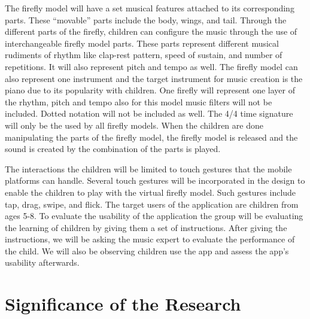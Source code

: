     The firefly model will have a set musical features attached to its corresponding parts. These “movable” parts include the body, wings, and tail. Through the different parts of the firefly, children can configure the music through the use of interchangeable firefly model parts. These parts represent different musical rudiments of rhythm like clap-rest pattern, speed of sustain, and number of repetitions. It will also represent pitch and tempo as well. The firefly model can also represent one instrument and the target instrument for music creation is the piano due to its popularity with children. One firefly will represent one layer of the rhythm, pitch and tempo also for this model music filters will not be included. Dotted notation will not be included as well. The 4/4 time signature will only be the used by all firefly models. When the children are done manipulating the parts of the firefly model, the firefly model is released and the sound is created by the combination of the parts is played.
    
    The interactions the children will be limited to touch gestures that the mobile platforms can handle. Several touch gestures will be incorporated in the design to enable the children to play with the virtual firefly model. Such gestures include tap, drag, swipe, and flick. The target users of the application are children from ages 5-8. To evaluate the usability of the application the group will be evaluating the learning of children by giving them a set of instructions. After giving the instructions, we will be asking the music expert to evaluate the performance of the child. We will also be observing children use the app and assess the app’s usability afterwards.

\begin{comment}

%
%
Generally, one paragraph should be allotted for each of your research objectives.

Each paragraph contains a brief overview of the concept/theory and the purpose of doing the associated objective.

Each paragraph also includes a description of the scope/limitation of your study.

* Please refer to the slides for examples.

\end{comment}
    

\section{Significance of the Research}
\label{sec:significance}

